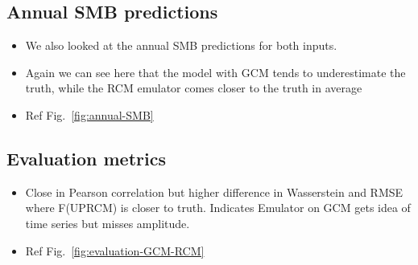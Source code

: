 \documentclass[a4paper,11pt,oneside]{report}
\begin{document}
\subsection{Annual SMB predictions}

\begin{itemize}
    \item We also looked at the annual SMB predictions for both inputs. 
    \item Again we can see here that the model with GCM tends to underestimate the truth, while the RCM emulator comes closer to the truth in average
    \item Ref Fig.~\ref{fig:annual-SMB}
\end{itemize}



\subsection{Evaluation metrics}

\begin{itemize}
    \item Close in Pearson correlation but higher difference in Wasserstein and RMSE where F(UPRCM) is closer to truth. Indicates Emulator on GCM gets idea of time series but misses amplitude.
    \item Ref Fig.~\ref{fig:evaluation-GCM-RCM}
\end{itemize}
\end{document}
